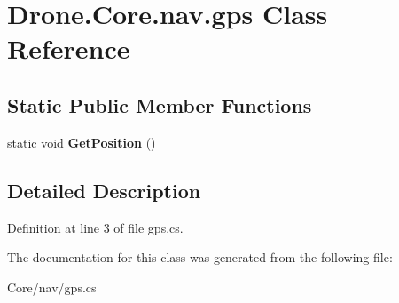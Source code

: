 \hypertarget{class_drone_1_1_core_1_1nav_1_1gps}{}\section{Drone.\+Core.\+nav.\+gps Class Reference}
\label{class_drone_1_1_core_1_1nav_1_1gps}
\subsection*{Static Public Member Functions}
\begin{DoxyCompactItemize}
\item 
\hypertarget{class_drone_1_1_core_1_1nav_1_1gps_adee2ce923c069538faa1b2dbb4d61a07}{}static void {\bfseries Get\+Position} ()\label{class_drone_1_1_core_1_1nav_1_1gps_adee2ce923c069538faa1b2dbb4d61a07}

\end{DoxyCompactItemize}


\subsection{Detailed Description}


Definition at line 3 of file gps.\+cs.



The documentation for this class was generated from the following file\+:\begin{DoxyCompactItemize}
\item 
Core/nav/gps.\+cs\end{DoxyCompactItemize}
